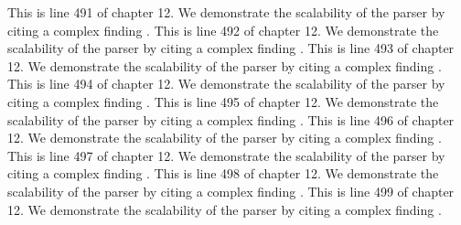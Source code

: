 This is line 491 of chapter 12. We demonstrate the scalability of the parser by citing a complex finding \cite{ref12_491}.
This is line 492 of chapter 12. We demonstrate the scalability of the parser by citing a complex finding \cite{ref12_492}.
This is line 493 of chapter 12. We demonstrate the scalability of the parser by citing a complex finding \cite{ref12_493}.
This is line 494 of chapter 12. We demonstrate the scalability of the parser by citing a complex finding \cite{ref12_494}.
This is line 495 of chapter 12. We demonstrate the scalability of the parser by citing a complex finding \cite{ref12_495}.
This is line 496 of chapter 12. We demonstrate the scalability of the parser by citing a complex finding \cite{ref12_496}.
This is line 497 of chapter 12. We demonstrate the scalability of the parser by citing a complex finding \cite{ref12_497}.
This is line 498 of chapter 12. We demonstrate the scalability of the parser by citing a complex finding \cite{ref12_498}.
This is line 499 of chapter 12. We demonstrate the scalability of the parser by citing a complex finding \cite{ref12_499}.


